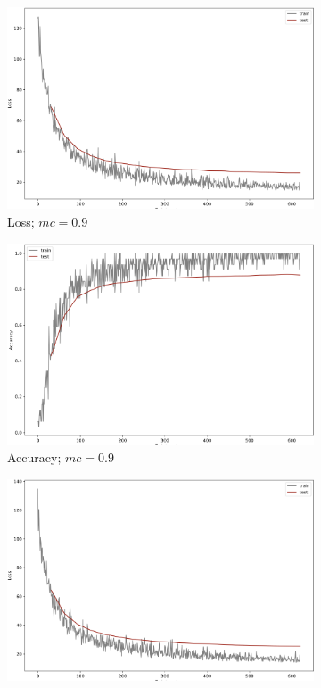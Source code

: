 \begin{figure}[]
\begin{subfigure}[b]{0.48\textwidth}
         \includegraphics[width=\textwidth]{observational/img/bnn/mc/LC_mc0.9.png}
         \caption{Loss; $mc=0.9$}
     \end{subfigure}
     \hfill
     \begin{subfigure}[b]{0.48\textwidth}
         \centering
         \includegraphics[width=\textwidth]{observational/img/bnn/mc/AC_mc0.9.png}
         \caption{Accuracy; $mc=0.9$}
     \end{subfigure} 
     \par\bigskip
     \begin{subfigure}[b]{0.48\textwidth}
         \centering
         \includegraphics[width=\textwidth]{observational/img/bnn/mc/LC_mc1.png}

\end{subfigure}
\end{figure}

